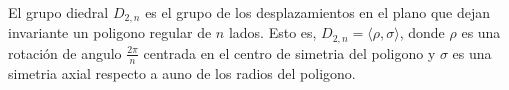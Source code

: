 \question 
El grupo diedral $D_{2,n}$ es el grupo de los desplazamientos en el plano que 
dejan invariante un poligono regular de $n$ lados. Esto es, 
$D_{2,n}=\langle \rho, \sigma \rangle$, donde $\rho$ es una rotación de angulo 
$\frac{2\pi}{n}$ centrada en el centro de simetria del poligono y $\sigma$ es 
una simetria axial respecto a auno de los radios del poligono.
